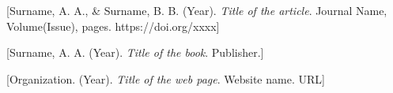\setlength{\parindent}{0pt}
{\hangindent=0.5in [Surname, A. A., \& Surname, B. B. (Year). \textit{Title of the article}. Journal Name, Volume(Issue), pages. https://doi.org/xxxx]\par}

{\hangindent=0.5in [Surname, A. A. (Year). \textit{Title of the book}. Publisher.]\par}

{\hangindent=0.5in [Organization. (Year). \textit{Title of the web page}. Website name. URL]\par}
\setlength{\parindent}{0.5in}
